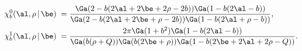 \begin{equation}
\begin{aligned}
\chi^{0}_{b}(\al,\rho\,|\,\be)\;=\;&
\frac{\Ga(2-b(2\al+2\be+2\rho-2b))\Ga(1-b(2\al-b))}
{\Ga(2-b(2\al+2\be+\rho-2b))\Ga(1-b(2\al+\rho-b))},\\
\chi^{1}_{b}(\al,\rho\,|\,\be)\;=\;&
\frac{2\pi \Ga(1+b^2)\Ga(1-b(2\al-b))}{
\Ga(b(\rho+Q))\Ga(b(2\be+\rho))\Ga(1-b(2\be+2\al+2\rho-Q))}.
\end{aligned}
\end{equation}

